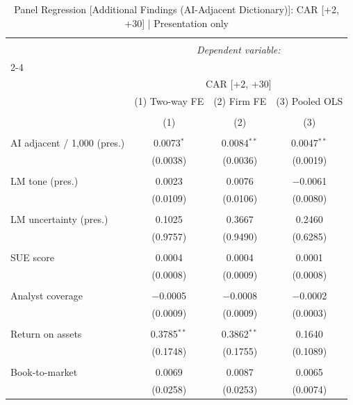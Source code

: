 
\begin{table}[!htbp] \centering 
  \caption{Panel Regression [Additional Findings (AI-Adjacent Dictionary)]: CAR [+2, +30]  |  Presentation only} 
  \label{} 
\begin{tabular}{@{\extracolsep{5pt}}lccc} 
\\[-1.8ex]\hline 
\hline \\[-1.8ex] 
 & \multicolumn{3}{c}{\textit{Dependent variable:}} \\ 
\cline{2-4} 
\\[-1.8ex] & \multicolumn{3}{c}{CAR [+2, +30]} \\ 
 & (1) Two-way FE & (2) Firm FE & (3) Pooled OLS \\ 
\\[-1.8ex] & (1) & (2) & (3)\\ 
\hline \\[-1.8ex] 
 AI adjacent / 1,000 (pres.) & 0.0073$^{*}$ & 0.0084$^{**}$ & 0.0047$^{**}$ \\ 
  & (0.0038) & (0.0036) & (0.0019) \\ 
  & & & \\ 
 LM tone (pres.) & 0.0023 & 0.0076 & $-$0.0061 \\ 
  & (0.0109) & (0.0106) & (0.0080) \\ 
  & & & \\ 
 LM uncertainty (pres.) & 0.1025 & 0.3667 & 0.2460 \\ 
  & (0.9757) & (0.9490) & (0.6285) \\ 
  & & & \\ 
 SUE score & 0.0004 & 0.0004 & 0.0001 \\ 
  & (0.0008) & (0.0009) & (0.0008) \\ 
  & & & \\ 
 Analyst coverage & $-$0.0005 & $-$0.0008 & $-$0.0002 \\ 
  & (0.0009) & (0.0009) & (0.0003) \\ 
  & & & \\ 
 Return on assets & 0.3785$^{**}$ & 0.3862$^{**}$ & 0.1640 \\ 
  & (0.1748) & (0.1755) & (0.1089) \\ 
  & & & \\ 
 Book-to-market & 0.0069 & 0.0087 & 0.0065 \\ 
  & (0.0258) & (0.0253) & (0.0074) \\ 

\end{tabular}
\end{table}
